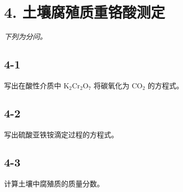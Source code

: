 \section*{4. 土壤腐殖质重铬酸测定}
\textit{下列为分问。}

\subsection*{4-1}
写出在酸性介质中 $\mathrm { K _ { 2 } C r _ { 2 } O _ { 7 } }$ 将碳氧化为 $\mathrm { { C O } _ { 2 } }$ 的⽅程式。

\subsection*{4-2}
写出硫酸亚铁铵滴定过程的⽅程式。

\subsection*{4-3}
计算⼟壤中腐殖质的质量分数。
